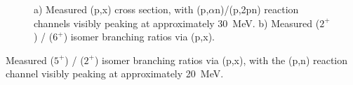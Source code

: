 




\begin{figure}
    \centering
    \caption{a) Measured (p,x) cross section, with (p,$\alpha$n)/(p,2pn) reaction channels visibly peaking at approximately \mbox{30 MeV}.   b) Measured   ($2^+$) /   ($6^+$)  isomer branching ratios via (p,x).} 
     \label{fig:discussion_52Mn}
\end{figure}

Measured  ($5^+$) /   ($2^+$)  isomer branching ratios via (p,x), with the (p,n) reaction channel visibly peaking at approximately \mbox{20 MeV}.

